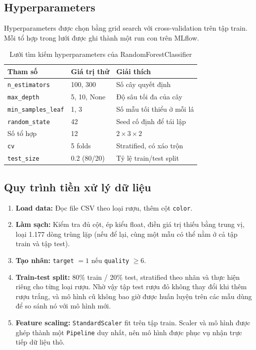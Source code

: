 \documentclass[12pt,a4paper]{report}
\begin{document}
\subsection{Hyperparameters}

Hyperparameters được chọn bằng grid search với cross-validation trên tập train. Mỗi tổ hợp trong lưới được ghi thành một run con trên MLflow.

\begin{table}[H]
  \centering
  \caption{Lưới tìm kiếm hyperparameters của RandomForestClassifier}
  \label{tab:hyperparams}
  \begin{tabular}{lll}
    \toprule
    \textbf{Tham số} & \textbf{Giá trị thử} & \textbf{Giải thích} \\
    \midrule
    \texttt{n\_estimators}      & 100, 300       & Số cây quyết định \\
    \texttt{max\_depth}         & 5, 10, None    & Độ sâu tối đa của cây \\
    \texttt{min\_samples\_leaf} & 1, 3           & Số mẫu tối thiểu ở mỗi lá \\
    \texttt{random\_state}      & 42             & Seed cố định để tái lập \\
    \midrule
    Số tổ hợp                   & 12             & $2 \times 3 \times 2$ \\
    \texttt{cv}                 & 5 folds        & Stratified, có xáo trộn \\
    \texttt{test\_size}         & 0.2 (80/20)    & Tỷ lệ train/test split \\
    \bottomrule
  \end{tabular}
\end{table}

\subsection{Quy trình tiền xử lý dữ liệu}

\begin{enumerate}
  \item \textbf{Load data:} Đọc file CSV theo loại rượu, thêm cột \texttt{color}.
  \item \textbf{Làm sạch:} Kiểm tra đủ cột, ép kiểu float, điền giá trị thiếu bằng trung vị, loại 1.177 dòng trùng lặp (nếu để lại, cùng một mẫu có thể nằm ở cả tập train và tập test).
  \item \textbf{Tạo nhãn:} \texttt{target} $= 1$ nếu \texttt{quality} $\geq 6$.
  \item \textbf{Train-test split:} 80\% train / 20\% test, stratified theo nhãn và thực hiện riêng cho từng loại rượu. Nhờ vậy tập test rượu đỏ không thay đổi khi thêm rượu trắng, và mô hình cũ không bao giờ được huấn luyện trên các mẫu dùng để so sánh nó với mô hình mới.
  \item \textbf{Feature scaling:} \texttt{StandardScaler} fit trên tập train. Scaler và mô hình được ghép thành một \texttt{Pipeline} duy nhất, nên mô hình được phục vụ nhận trực tiếp dữ liệu thô.
\end{enumerate}
\end{document}
